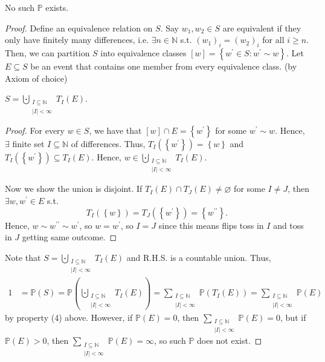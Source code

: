 \begin{proposition}
    No such \(\mathbb{P}\) exists. 
\end{proposition}
\begin{proof}
    Define an equivalence relation on \(S\). Say \(w_1, w_2 \in S\) are equivalent if they only have finitely many differences, i.e. \(\exists n \in \mathbb{N}\) s.t. \((w_1)_i = (w_2)_i\) for all \(i \ge n\). Then, we can partition \(S\) into equivalence classes \([w] = \left\{ w^{\prime} \in S: w^{\prime} \sim w \right\} \). Let \(E \subseteq S\) be an event that contains one member from every equivalence class. (by Axiom of choice) 
    \begin{claim}
        \(S = \bigcupdot_{\substack{I \subseteq \mathbb{N} \\ \vert I \vert < \infty}} T_I(E) \). 
    \end{claim}        
    \begin{proof}
        For every \(w \in S\), we have that \([w] \cap E = \left\{ w^{\prime} \right\} \) for some \(w^{\prime} \sim w\). Hence, \(\exists \) finite set \(I \subseteq \mathbb{N} \) of differences. Thus, \(T_I (\left\{ w^{\prime}  \right\} ) = \left\{ w \right\} \) and \(T_I (\left\{ w^{\prime}  \right\} ) \subseteq T_I(E)\). Hence, \(w \in \bigcupdot_{\substack{I \subseteq \mathbb{N} \\ \vert I \vert < \infty}} T_I(E)\).

        Now we show the union is disjoint. If \(T_I(E) \cap T_J(E) \neq \varnothing \) for some \(I \neq J\), then \(\exists w, w^{\prime} \in E\) s.t. 
        \[
            T_I(\left\{ w \right\} ) = T_J(\left\{ w^{\prime} \right\} ) = \left\{ w^{\prime\prime}  \right\}. 
        \]
        Hence, \(w \sim w^{\prime\prime} \sim w^{\prime}\), so \(w = w^{\prime}\), so \(I = J\) since this means flips toss in \(I\) and toss in \(J\) getting same outcome.             
    \end{proof}

    Note that \(S = \bigcupdot_{\substack{I \subseteq \mathbb{N} \\ \vert I \vert < \infty}} T_I(E)\) and R.H.S. is a countable union. Thus,
    \begin{align*}
        1 &= \mathbb{P} (S) = \mathbb{P} \left( \bigcupdot_{\substack{I \subseteq \mathbb{N} \\ \vert I \vert < \infty}} T_I(E) \right) = \sum_{\substack{I \subseteq \mathbb{N} \\ \vert I \vert < \infty }} \mathbb{P} (T_I(E)) = \sum_{\substack{I \subseteq \mathbb{N} \\ \vert I \vert < \infty }} \mathbb{P} (E)
    \end{align*} 
    by property (4) above. However, if \(\mathbb{P} (E) = 0\), then \(\sum_{\substack{I \subseteq \mathbb{N} \\ \vert I \vert < \infty }} \mathbb{P} (E) = 0\), but if \(\mathbb{P} (E) > 0\), then \(\sum_{\substack{I \subseteq \mathbb{N} \\ \vert I \vert < \infty }} \mathbb{P} (E) = \infty\), so such \(\mathbb{P} \) does not exist.     
\end{proof}

